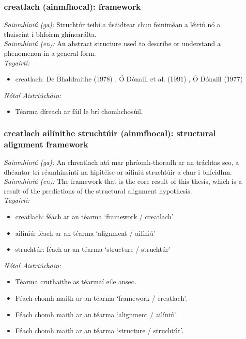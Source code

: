 \documentclass{article}
\begin{document}
\subsubsection*{creatlach (ainmfhocal): framework}
 \noindent \textit{Sainmhíniú (ga):} Struchtúr teibí a úsáidtear chun feiniméan a léiriú nó a thuiscint i bhfoirm ghinearálta.
\\
 \noindent \textit{Sainmhíniú (en):} An abstract structure used to describe or understand a phenomenon in a general form.
\\
 \noindent \textit{Tagairtí:}
\begin{itemize}
	\item creatlach: De Bhaldraithe (1978) \cite{de-bhaldraithe}, Ó Dónaill et al. (1991) \cite{focloir-beag}, Ó Dónaill (1977) \cite{odonaill}
\end{itemize}

 \noindent \textit{Nótaí Aistriúcháin:}
\begin{itemize}
	\item Téarma díreach ar fáil le brí chomhchosúil.
\end{itemize}


\subsubsection*{creatlach ailínithe struchtúir (ainmfhocal): structural alignment framework}
 \noindent \textit{Sainmhíniú (ga):} An chreatlach atá mar phríomh-thoradh ar an tráchtas seo, a dhéantar trí réamhinsintí na hipitéise ar ailiniú struchtúir a chur i bhfeidhm.
\\
 \noindent \textit{Sainmhíniú (en):} The framework that is the core result of this thesis, which is a result of the predictions of the structural alignment hypothesis.
\\
 \noindent \textit{Tagairtí:}
\begin{itemize}
	\item creatlach: féach ar an téarma `framework / creatlach'
	\item ailíniú: féach ar an téarma `alignment / ailíniú'
	\item struchtúr: féach ar an téarma `structure / struchtúr'
\end{itemize}

 \noindent \textit{Nótaí Aistriúcháin:}
\begin{itemize}
	\item Téarma cruthaithe as téarmaí eile anseo.
	\item Féach chomh maith ar an téarma `framework / creatlach'.
	\item Féach chomh maith ar an téarma `alignment / ailíniú'.
	\item Féach chomh maith ar an téarma `structure / struchtúr'.
\end{itemize}
\end{document}
